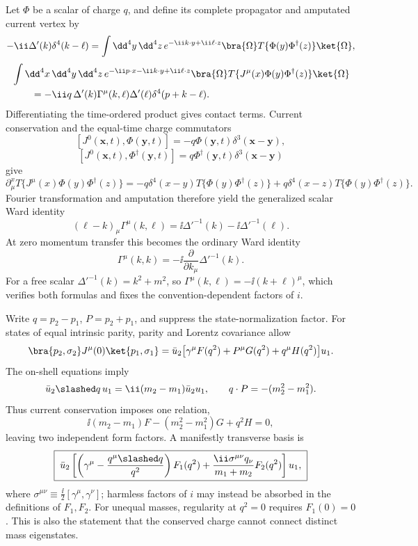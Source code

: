 \begin{enumerate}
Let \(\Phi\) be a scalar of charge \(q\), and define its complete
propagator and amputated current vertex by
\[
 -\ii\Delta'(k)\delta^4(k-\ell)
 =\int \dd^4y\,\dd^4z\,e^{-\ii k\cdot y+\ii\ell\cdot z}
 \bra{\Omega}T\{\Phi(y)\Phi^\dagger(z)\}\ket{\Omega},
\]
\[
 \begin{split}
 &\int \dd^4x\,\dd^4y\,\dd^4z\,
 e^{-\ii p\cdot x-\ii k\cdot y+\ii\ell\cdot z}
 \bra{\Omega}T\{J^\mu(x)\Phi(y)\Phi^\dagger(z)\}\ket{\Omega}\\
 &\qquad=-\ii q\,\Delta'(k)\Gamma^\mu(k,\ell)
 \Delta'(\ell)\delta^4(p+k-\ell).
 \end{split}
\]
Differentiating the time-ordered product gives contact terms.  Current
conservation and the equal-time charge commutators
\[
 [J^0(\mathbf x,t),\Phi(\mathbf y,t)]
 =-q\Phi(\mathbf y,t)\delta^3(\mathbf x-\mathbf y),
\]
\[
 [J^0(\mathbf x,t),\Phi^\dagger(\mathbf y,t)]
 =q\Phi^\dagger(\mathbf y,t)\delta^3(\mathbf x-\mathbf y)
\]
give
\[
 \partial_\mu^xT\{J^\mu(x)\Phi(y)\Phi^\dagger(z)\}
 =-q\delta^4(x-y)T\{\Phi(y)\Phi^\dagger(z)\}
 +q\delta^4(x-z)T\{\Phi(y)\Phi^\dagger(z)\}.
\]
Fourier transformation and amputation therefore yield the generalized
scalar Ward identity
\[
 \boxed{\;
 (\ell-k)_\mu\Gamma^\mu(k,\ell)
 =\ii\Delta'^{-1}(k)-\ii\Delta'^{-1}(\ell).\;}
\]
At zero momentum transfer this becomes the ordinary Ward identity
\[
 \boxed{\;
 \Gamma^\mu(k,k)
 =-\ii\frac{\partial}{\partial k_\mu}\Delta'^{-1}(k).\;}
\]
For a free scalar \(\Delta'^{-1}(k)=k^2+m^2\), so
\(\Gamma^\mu(k,\ell)=-\ii(k+\ell)^\mu\), which verifies both formulas and
fixes the convention-dependent factors of \(i\).

Write \(q=p_2-p_1\), \(P=p_2+p_1\), and suppress the state-normalization
factor.  For states of equal intrinsic parity, parity and Lorentz
covariance allow
\[
 \bra{p_2,\sigma_2}J^\mu(0)\ket{p_1,\sigma_1}
 =\bar u_2\bigl[
 \gamma^\mu F(q^2)+P^\mu G(q^2)+q^\mu H(q^2)
 \bigr]u_1 .
\]
The on-shell equations imply
\[
 \bar u_2\slashed q\,u_1
 =\ii(m_2-m_1)\bar u_2u_1,\qquad
 q\cdot P=-(m_2^2-m_1^2).
\]
Thus current conservation imposes one relation,
\[
 \ii(m_2-m_1)F-(m_2^2-m_1^2)G+q^2H=0,
\]
leaving two independent form factors.  A manifestly transverse basis is
\[
 \boxed{\;
 \bar u_2\left[
 \left(\gamma^\mu-\frac{q^\mu\slashed q}{q^2}\right)F_1(q^2)
 +\frac{\ii\sigma^{\mu\nu}q_\nu}{m_1+m_2}F_2(q^2)
 \right]u_1,\;}
\]
where \(\sigma^{\mu\nu}\equiv\tfrac{\ii}{2}
[\gamma^\mu,\gamma^\nu]\); harmless factors of \(i\) may instead be
absorbed in the definitions of \(F_1,F_2\).  For unequal masses, regularity
at \(q^2=0\) requires \(F_1(0)=0\).  This is also the statement that the
conserved charge cannot connect distinct mass eigenstates.


\end{enumerate}
